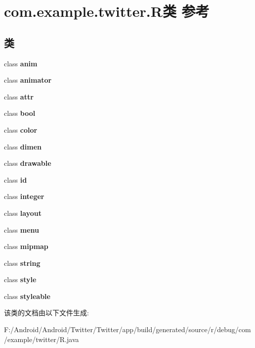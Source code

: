 \hypertarget{classcom_1_1example_1_1twitter_1_1_r}{}\section{com.\+example.\+twitter.\+R类 参考}
\label{classcom_1_1example_1_1twitter_1_1_r}
\subsection*{类}
\begin{DoxyCompactItemize}
\item 
class {\bfseries anim}
\item 
class {\bfseries animator}
\item 
class {\bfseries attr}
\item 
class {\bfseries bool}
\item 
class {\bfseries color}
\item 
class {\bfseries dimen}
\item 
class {\bfseries drawable}
\item 
class {\bfseries id}
\item 
class {\bfseries integer}
\item 
class {\bfseries layout}
\item 
class {\bfseries menu}
\item 
class {\bfseries mipmap}
\item 
class {\bfseries string}
\item 
class {\bfseries style}
\item 
class {\bfseries styleable}
\end{DoxyCompactItemize}


该类的文档由以下文件生成\+:\begin{DoxyCompactItemize}
\item 
F\+:/\+Android/\+Android/\+Twitter/\+Twitter/app/build/generated/source/r/debug/com/example/twitter/R.\+java\end{DoxyCompactItemize}
